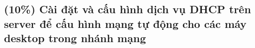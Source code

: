 \subsection{(10\%) Cài đặt và cấu hình dịch vụ DHCP trên server để cấu hình mạng tự động
  cho các máy desktop trong nhánh mạng}
\setcounter{figure}{0}
